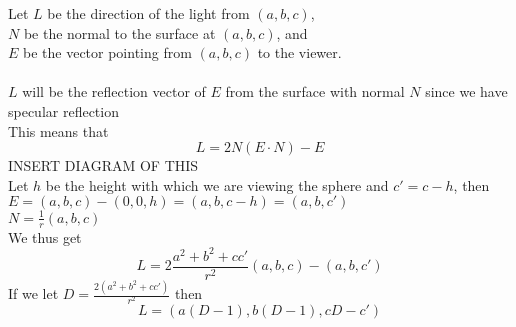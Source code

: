 \documentclass[11pt,psfig]{article}
\begin{document}
Let $L$ be the direction of the light from $(a,b,c)$, \\
$N$ be the normal to the surface at $(a,b,c)$, and \\
$E$ be the vector pointing from $(a,b,c)$ to the viewer. \\
\\
$L$ will be the reflection vector of $E$ from the surface with normal $N$ since we have specular reflection\\
This means that 
\[
L = 2N(E \cdot N) - E
\]
INSERT DIAGRAM OF THIS\\
Let $h$ be the height with which we are viewing the sphere and $c' = c-h$, then\\
$E = (a,b,c) - (0,0,h) = (a,b,c-h) = (a,b,c')$\\
$N = \frac{1}{r}(a,b,c)$\\
We thus get
\[
L = 2 \frac{a^2 + b^2 + c c'}{r^2} (a,b,c) - (a,b,c')
\]
If we let $D = \frac{2(a^2 + b^2 + c c')}{r^2}$ then
\[
L = (a(D-1) , b(D-1), cD - c')
\]
\end{document}
